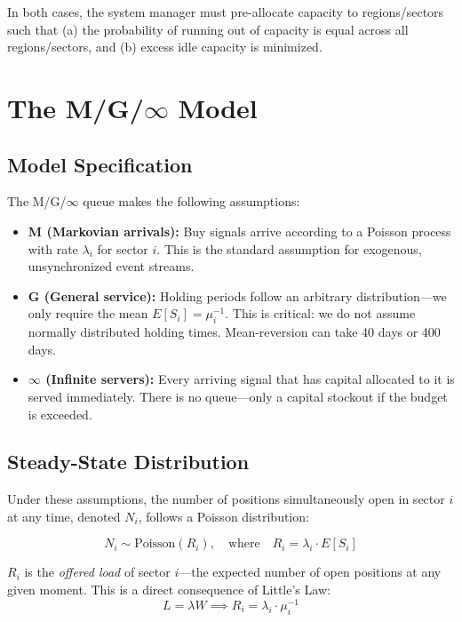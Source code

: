 \documentclass[11pt, oneside]{book}
\begin{document}
\vspace{0.5em}
In both cases, the system manager must pre-allocate capacity to regions/sectors such that (a) the probability of running out of capacity is equal across all regions/sectors, and (b) excess idle capacity is minimized.

\section{The M/G/$\infty$ Model}

\subsection{Model Specification}

The M/G/$\infty$ queue makes the following assumptions:

\begin{itemize}[leftmargin=*]
    \item \textbf{M (Markovian arrivals):} Buy signals arrive according to a Poisson process with rate $\lambda_i$ for sector $i$. This is the standard assumption for exogenous, unsynchronized event streams.
    \item \textbf{G (General service):} Holding periods follow an arbitrary distribution---we only require the mean $E[S_i] = \mu_i^{-1}$. This is critical: we do not assume normally distributed holding times. Mean-reversion can take 40 days or 400 days.
    \item \textbf{$\infty$ (Infinite servers):} Every arriving signal that has capital allocated to it is served immediately. There is no queue---only a capital stockout if the budget is exceeded.
\end{itemize}

\subsection{Steady-State Distribution}

Under these assumptions, the number of positions simultaneously open in sector $i$ at any time, denoted $N_i$, follows a Poisson distribution:

\begin{equation}
    N_i \sim \text{Poisson}(R_i), \quad \text{where} \quad R_i = \lambda_i \cdot E[S_i]
\end{equation}

$R_i$ is the \textit{offered load} of sector $i$---the expected number of open positions at any given moment. This is a direct consequence of Little's Law:
\begin{equation}
    L = \lambda W \implies R_i = \lambda_i \cdot \mu_i^{-1}
\end{equation}
\end{document}

